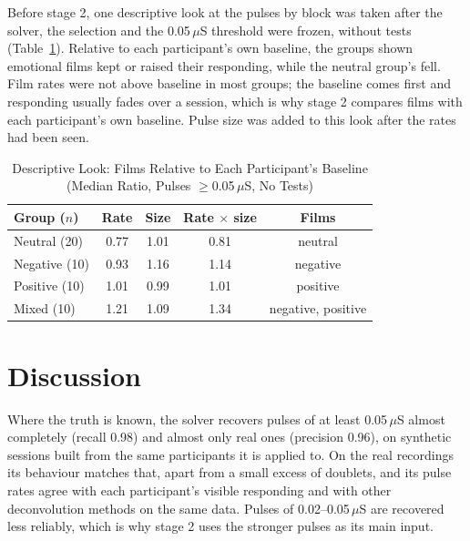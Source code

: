 \documentclass[conference]{IEEEtran}
\newcommand{\uS}{\,$\mu$S}
\begin{document}
Before stage 2, one descriptive look at the pulses by block was taken after the solver, the
selection and the 0.05\uS{} threshold were frozen, without tests (Table~\ref{tab:blocks}).
Relative to each participant's own baseline, the groups shown emotional films kept or raised their
responding, while the neutral group's fell. Film rates were not above baseline in most groups;
the baseline comes first and responding usually fades over a session, which is why stage 2
compares films with each participant's own baseline. Pulse size was added to this look after the
rates had been seen.

\begin{table}[t]
\centering
\caption{Descriptive Look: Films Relative to Each Participant's Baseline (Median Ratio, Pulses
$\ge$0.05\uS, No Tests)}
\label{tab:blocks}
\footnotesize
\begin{tabular}{@{}lcccc@{}}
\toprule
Group ($n$) & Rate & Size & Rate $\times$ size & Films \\
\midrule
Neutral (20) & 0.77 & 1.01 & 0.81 & neutral \\
Negative (10) & 0.93 & 1.16 & 1.14 & negative \\
Positive (10) & 1.01 & 0.99 & 1.01 & positive \\
Mixed (10) & 1.21 & 1.09 & 1.34 & negative, positive \\
\bottomrule
\end{tabular}
\end{table}

\section{Discussion}

Where the truth is known, the solver recovers pulses of at least 0.05\uS{} almost completely
(recall 0.98) and almost only real ones (precision 0.96), on synthetic sessions built from the
same participants it is applied to. On the real recordings its behaviour matches that, apart from
a small excess of doublets, and its pulse rates agree with each participant's visible responding
and with other deconvolution methods on the same data. Pulses of 0.02--0.05\uS{} are recovered
less reliably, which is why stage 2 uses the stronger pulses as its main input.
\end{document}

